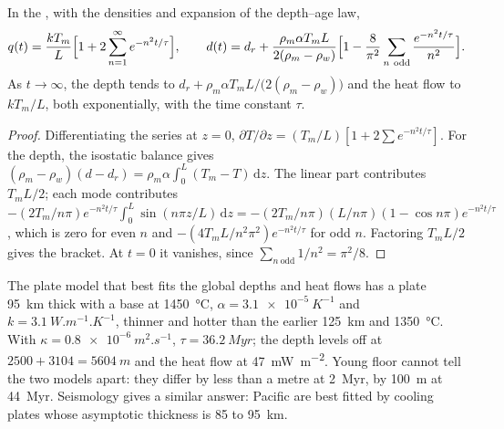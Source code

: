 \begin{proposition}\label{prop:b3:lithosphere-thermal-models:plate-depth}
In the , with the densities and expansion of the depth--age
law,
\[
  q(t) = \frac{kT_m}{L}\Bigl[1 + 2\sum_{n=1}^\infty e^{-n^2t/\tau}\Bigr],\qquad
  d(t) = d_r + \frac{\rho_m\alpha T_mL}{2(\rho_m - \rho_w)}
  \Bigl[1 - \frac{8}{\pi^2}\sum_{n\ \text{odd}}\frac{e^{-n^2t/\tau}}{n^2}\Bigr].
\]
As $t \to \infty$, the depth tends to $d_r + \rho_m\alpha T_mL/\bigl(2(\rho_m -
\rho_w)\bigr)$ and the heat flow to $kT_m/L$, both exponentially, with the time
constant $\tau$.
\end{proposition}

\begin{proof}
Differentiating the series at $z = 0$, $\partial T/\partial z = (T_m/L)[1 +
2\sum e^{-n^2t/\tau}]$. For the depth, the isostatic balance gives $(\rho_m -
\rho_w)(d - d_r) = \rho_m\alpha\int_0^L(T_m - T)\,\mathrm dz$. The linear part
contributes $T_mL/2$; each mode contributes $-(2T_m/n\pi)e^{-n^2t/\tau}
\int_0^L\sin(n\pi z/L)\,\mathrm dz = -(2T_m/n\pi)(L/n\pi)(1 - \cos n\pi)
e^{-n^2t/\tau}$, which is zero for even $n$ and $-(4T_mL/n^2\pi^2)
e^{-n^2t/\tau}$ for odd $n$. Factoring $T_mL/2$ gives the bracket. At $t = 0$
it vanishes, since $\sum_{n\ \text{odd}}1/n^2 = \pi^2/8$.
\end{proof}

The plate model that best fits the global depths and heat flows has a plate
\qty{95}{km} thick with a base at \qty{1450}{\celsius}, $\alpha =
\qty{3.1e-5}{K^{-1}}$ and $k = \qty{3.1}{W.m^{-1}.K^{-1}}$, thinner and hotter
than the earlier \qty{125}{km} and \qty{1350}{\celsius}. With $\kappa =
\qty{0.8e-6}{m^2.s^{-1}}$, $\tau = \qty{36.2}{Myr}$; the depth levels off at
$2500 + 3104 = \qty{5604}{m}$ and the heat flow at \qty{47}{mW.m^{-2}}. Young
floor cannot tell the two models apart: they differ by less than a metre at
\qty{2}{Myr}, by \qty{100}{m} at \qty{44}{Myr}. Seismology gives a similar
answer: Pacific  are best fitted by cooling plates whose
asymptotic thickness is 85 to \qty{95}{km}.

